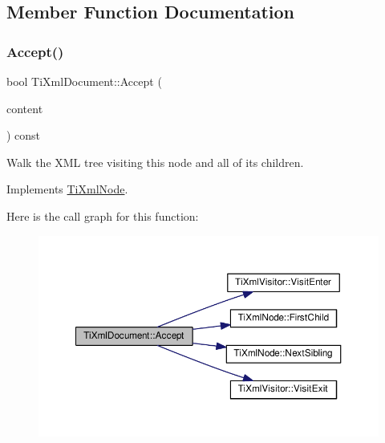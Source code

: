 \subsection{Member Function Documentation}
\mbox{\label{class_ti_xml_document_a8ddd6eec722cbd25900bbac664909bac}} 
\subsubsection{\texorpdfstring{Accept()}{Accept()}}
{\footnotesize\ttfamily bool Ti\+Xml\+Document\+::\+Accept (\begin{DoxyParamCaption}\item[{\hyperlink{class_ti_xml_visitor}{Ti\+Xml\+Visitor} $\ast$}]{content }\end{DoxyParamCaption}) const\hspace{0.3cm}{\ttfamily [virtual]}}

Walk the X\+ML tree visiting this node and all of its children. 

Implements \hyperlink{class_ti_xml_node_acc0f88b7462c6cb73809d410a4f5bb86}{Ti\+Xml\+Node}.

Here is the call graph for this function\+:
\nopagebreak
\begin{figure}[H]
\begin{center}
\leavevmode
\includegraphics[width=350pt]{class_ti_xml_document_a8ddd6eec722cbd25900bbac664909bac_cgraph}
\end{center}
\end{figure}
\mbox{\label{class_ti_xml_document_ac66b8c28db86363315712a3574e87c35}} 

